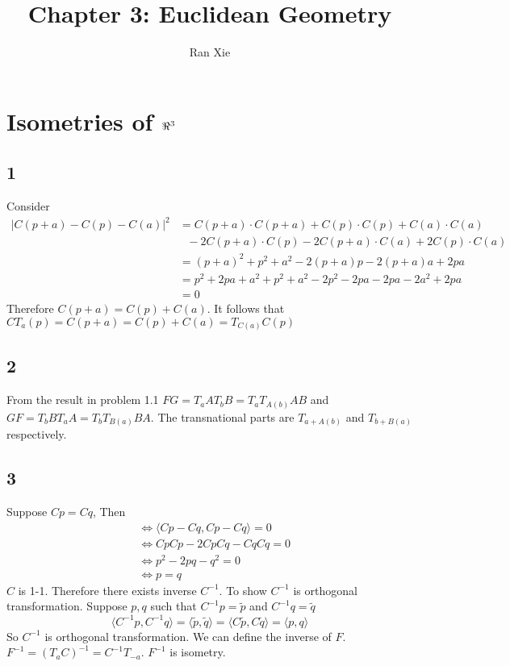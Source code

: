 \documentclass[12pt]{article}
\title{Chapter 3: Euclidean Geometry}
\author{Ran Xie}
\begin{document}
	\maketitle

\section{Isometries of $\real^3$}	
\subsection*{1}
Consider $$ \begin{aligned}
	|C(p+a) - C(p) - C(a)|^2 &= C(p+a)\cdot C(p+a) + C(p)\cdot C(p) + C(a) \cdot C(a) \\&\ \ \   - 2C(p+a)\cdot C(p) - 2C(p+a)\cdot C(a) + 2C(p)\cdot C(a)  \\
	          &= (p+a)^2 + p^2 + a^2 - 2(p+a)p - 2(p+a)a + 2pa \\
	          &= p^2 + 2pa + a^2 + p^2 + a^2 - 2p^2 - 2pa - 2pa - 2a^2 + 2pa \\
	          &= 0
\end{aligned}$$
Therefore $C(p + a) = C(p) + C(a)$. It follows that $CT_a(p) = C(p + a) = C(p) + C(a) = T_{C(a)}C(p)$ \QED


\subsection*{2}
From the result in problem 1.1
$FG = T_aA T_b B = T_aT_{A(b)}AB$ and $GF=T_bBT_aA = T_bT_{B(a)}BA$. The transnational parts are $T_{a+A(b)}$ and $T_{b+B(a)}$ respectively.

\subsection*{3}
Suppose $Cp = Cq$,  Then $$
\begin{aligned}
	&\Leftrightarrow \langle Cp - Cq, Cp - Cq\rangle = 0 \\
	&\Leftrightarrow CpCp - 2CpCq - CqCq = 0 \\
	&\Leftrightarrow p^2 - 2pq - q^2 = 0 \\
	&\Leftrightarrow p = q
\end{aligned}$$ 
$C$ is 1-1. Therefore there exists inverse $C^{-1}$. To show $C^{-1}$ is orthogonal transformation. Suppose $p, q$ such that $C^{-1}p = \tilde{p}$ and $C^{-1}q = \tilde{q}$
$$ \langle C^{-1}p, C^{-1}q\rangle =  \langle\tilde{p}, \tilde{q}\rangle = \langle C\tilde{p}, C\tilde{q}\rangle = \langle p, q\rangle $$
So $C^{-1}$ is orthogonal transformation. We can define the inverse of $F$. $F^{-1} = (T_aC)^{-1}  = C^{-1}T_{-a}$. $F^{-1}$ is isometry. 
\end{document}
